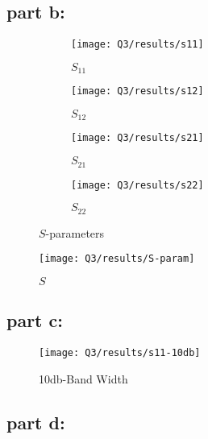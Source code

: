 \documentclass[12pt,onecolumn,a4paper]{article}
\begin{document}
	
	
	\FloatBarrier
	\subsection{part b:}
	
	\begin{figure}[h]
		\centering
		\begin{subfigure}{.45\linewidth}
			\centering
			\texttt{[image: Q3/results/s11]}
			\caption{$S_{11}$}
			\label{fig:s11}
		\end{subfigure}
		\hfill
		\begin{subfigure}{.45\linewidth}
			\centering
			\texttt{[image: Q3/results/s12]}
			\caption{$S_{12}$}
			\label{fig:s12}
		\end{subfigure}
		
		\begin{subfigure}{.45\linewidth}
			\centering
			\texttt{[image: Q3/results/s21]}
			\caption{$S_{21}$}
			\label{fig:s21}
		\end{subfigure}
		\hfill
		\begin{subfigure}{.45\linewidth}
			\centering
			\texttt{[image: Q3/results/s22]}
			\caption{$S_{22}$}
			\label{fig:s22}
		\end{subfigure}
		\caption{$S$-parameters}
	\end{figure}	
	
	
	
	\begin{figure}
		\centering
		\texttt{[image: Q3/results/S-param]}
		\caption{$S$}
		\label{fig:S-param}
	\end{figure}
	
	
	
	
	\FloatBarrier
	\subsection{part c:}
	
	
	\begin{figure}[h]
		\centering
		\texttt{[image: Q3/results/s11-10db]}
		\caption{10db-Band Width}
		\label{fig:s11-10db}
	\end{figure}
	
	\FloatBarrier
	\subsection{part d:}
	
\end{document}
